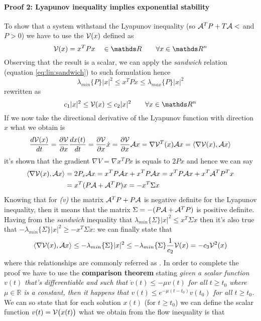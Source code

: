 		\paragraph{Proof 2: Lyapunov inequality implies exponential stability} To show that a system withstand the Lyapunov inequality (so $\mathcal{A}^T P + T \mathcal{A} < $ and $P>0$) we have to use the  $\mathcal V(x)$ defined as
		\begin{equation}
			\lyap (x) = x^T P x \quad \in \mathds R \qquad \forall x\in \mathds R^n
		\end{equation}
		Observing that the result is a scalar, we can apply the \textit{sandwich} relation (equation \ref{eq:lin:sandwich}) to such formulation hence
		\[ \lambda_{min}\{P\} |x|^2 \leq x^T P x \leq \lambda_{max}\{P\} |x|^2 \]
		rewritten as
		\[ c_1 |x|^2 \leq \lyap(x) \leq c_2 |x|^2 \qquad \forall x \in \mathds R^n \]
		If we now take the directional derivative of the Lyapunov function with direction $x$ what we obtain is
		\[ \frac{d\mathcal V (x)}{dt} = \frac{\partial \mathcal V}{\partial x} \frac{dx(t)}{dt} = \frac{\partial \mathcal V}{\partial x} \dot x = \frac{\partial \mathcal V}{\partial x} \mathcal{A} x = \nabla \mathcal V^T(x)  \mathcal{A} x = \left\langle \nabla \mathcal V(x), \mathcal{A} x \right\rangle \]
		it's shown that the gradient $\nabla V = \nabla x^TPx$ is equals to $2P x$ and hence we can say
		\begin{align*}
			\left\langle \nabla \mathcal V (x), \mathcal{A} x \right\rangle & = 2 P_x \mathcal{A} x = x^T P \mathcal{A} x + x^T P \mathcal{A} x = x^T P \mathcal{A} x + x^T \mathcal{A}^T P^T x \\
			&= x^T (P\mathcal{A} + \mathcal{A}^T P) x = -x^T \Sigma x
		\end{align*}
		Knowing that for \textit{(v)} the matrix $\mathcal{A}^T P + P \mathcal{A}$ is negative definite for the Lyapunov inequality, then it means that the matrix $\Sigma= - (P\mathcal{A} + \mathcal{A}^T P)$ is positive definite. Having from the \textit{sandwich} inequality that $\lambda_{min}\{\Sigma\} |x|^2 \leq x^T\Sigma x$ then it's also true that $- \lambda_{min}\{\Sigma\} |x|^2 \geq - x^T\Sigma x$: we can finally state that
		\[ \left\langle \nabla \mathcal V(x), \mathcal{A} x \right\rangle \leq -\lambda_{min}\{\Sigma\} |x|^2 \leq -\lambda_{min}\{\Sigma\} \frac 1 {c_2} \mathcal V(x) =- c_3 \mathcal V^2(x) \]
		where this relationships are commonly referred as . In order to complete the proof we have to use the \textbf{comparison theorem} stating {\itshape given a scalar function $v(t)$ that's differentiable and such that $\dot v(t) \leq -\mu v(t)$ for all $t\geq t_0$ where $\mu \in \mathds R$ is a constant, then it happens that $v(t) \leq e^{-\mu(t-t_0)} v(t_0)$ for all $t\geq t_0$.} We can so state that for each solution $x(t)$ (for $t\geq t_0$) we can define the scalar function $v(t) = \mathcal V\big(x(t)\big)$ what we obtain from the flow inequality is that
